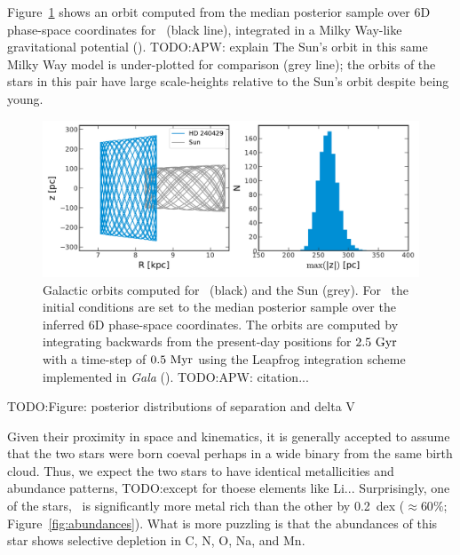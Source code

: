\documentclass[manuscript]{aastex6}
\newcommand{\project}[1]{\textsl{#1}}
\newcommand{\figname}{Figure}
\newcommand{\sunanalog}{\text{Krios}}
\newcommand{\bizarreone}{\text{Kronos}}
\newcommand{\todo}[1]{{\color{blue}TODO:#1}}
\begin{document}
\figname~\ref{fig:orbit} shows an orbit computed from the median posterior
sample over 6D phase-space coordinates for \sunanalog\ (black line), integrated
in a Milky Way-like gravitational potential (\cite{Gala:2017}). \todo{APW:
explain}
The Sun's orbit in this same Milky Way model is under-plotted for comparison
(grey line); the orbits of the stars in this pair have large scale-heights
relative to the Sun's orbit despite being young.

\begin{figure}[htbp]
  \begin{center}
    \includegraphics[width=\linewidth]{orbits.pdf}
  \end{center}
  \caption{%
    Galactic orbits computed for \sunanalog\ (black) and the Sun (grey).
    For \sunanalog\, the initial conditions are set to the median posterior
    sample over the inferred 6D phase-space coordinates.
    The orbits are computed by integrating backwards from the present-day
    positions for $2.5~{\rm Gyr}$ with a time-step of $0.5~{\rm Myr}$ using the
    Leapfrog integration scheme implemented in \project{Gala}
    (\citealt{Gala:2017}). \todo{APW: citation...}
\label{fig:orbit}}
\end{figure}



\todo{Figure: posterior distributions of separation and delta V}

Given their proximity in space and kinematics,
it is generally accepted to assume that the two stars were born coeval
perhaps in a wide binary from the same birth cloud.
Thus, we expect the two stars to have identical metallicities and abundance patterns,
\todo{except for thoese elements like Li...}
Surprisingly, one of the stars, \bizarreone\ is significantly more metal
rich than the other by 0.2~dex ($\approx 60\%$; \figname~\ref{fig:abundances}).
What is more puzzling is that the abundances of this star
shows selective depletion in C, N, O, Na, and Mn.
\end{document}
